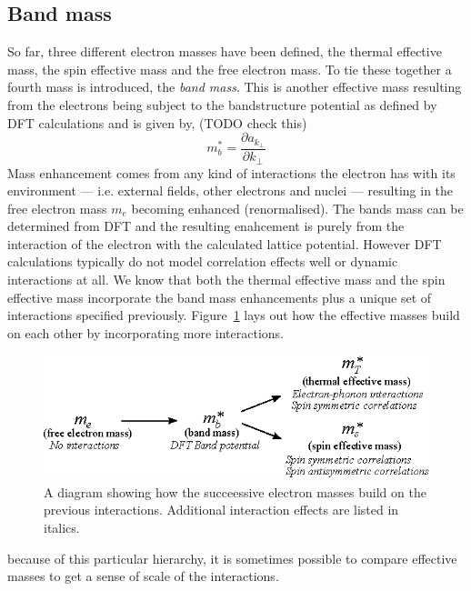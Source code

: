 \subsection{Band mass}

So far, three different electron masses have been defined, the thermal effective mass, the spin effective mass and the free electron mass. To tie these together a fourth mass is introduced, the \textit{band mass}. This is another effective mass resulting from the electrons being subject to the bandstructure potential as defined by \ac{DFT} calculations and is given by,
(TODO check this)
\begin{equation}
  m^*_b = \frac{\partial a_{k_\perp}}{\partial k_\perp}
\end{equation}
Mass enhancement comes from any kind of interactions the electron has with its environment --- i.e. external fields, other electrons and nuclei --- resulting in the free electron mass $m_e$ becoming enhanced (renormalised). The bands mass can be determined from \ac{DFT} and the resulting enahcement is purely from the interaction of the electron with the calculated lattice potential. However \ac{DFT} calculations typically do not model correlation effects well or dynamic interactions at all. We know that both the thermal effective mass and the spin effective mass incorporate the band mass enhancements plus a unique set of interactions specified previously. Figure~\ref{Fig:Theo:EffectiveMassInheritance} lays out how the effective masses build on each other by incorporating more interactions.
\begin{figure}[htbp]
    \begin{center}
        \includegraphics[scale=0.9]{Chapter-ExperimentalTechnique/Figures/EffectiveMassInheritance/EffectiveMassInheritance}
        \caption{A diagram showing how the succeessive electron masses build on the previous interactions. Additional interaction effects are listed in italics.}
        \label{Fig:Theo:EffectiveMassInheritance}
    \end{center}
\end{figure}
because of this particular hierarchy, it is sometimes possible to compare effective masses to get a sense of scale of the interactions.


